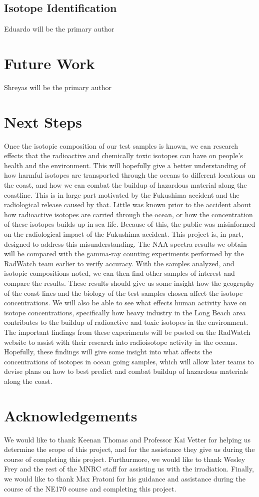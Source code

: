 \documentclass[]{article}
\begin{document}
\subsection{Isotope Identification}
Eduardo will be the primary author

\section{Future Work}
Shreyas will be the primary author


\section{Next Steps}
  
Once the isotopic composition of our test samples is known, we can research effects that the radioactive and chemically toxic isotopes can have on people’s health and the environment. This will hopefully give a better understanding of how harmful isotopes are transported through the oceans to different locations on the coast, and how we can combat the buildup of hazardous material along the coastline. This is in large part motivated by the Fukushima accident and the radiological release caused by that. Little was known prior to the accident about how radioactive isotopes are carried through the ocean, or how the concentration of these isotopes builds up in sea life. Because of this, the public was misinformed on the radiological impact of the Fukushima accident. This project is, in part, designed to address this misunderstanding. The NAA spectra results we obtain will be compared with the gamma-ray counting experiments performed by the RadWatch team earlier to verify accuracy. With the samples analyzed, and isotopic compositions noted, we can then find other samples of interest and compare the results. These results should give us some insight how the geography of the coast lines and the biology of the test samples chosen affect the isotope concentrations. We will also be able to see what effects human activity have on isotope concentrations, specifically how heavy industry in the Long Beach area contributes to the buildup of radioactive and toxic isotopes in the environment. The important findings from these experiments will be posted on the RadWatch website to assist with their research into radioisotope activity in the oceans. Hopefully, these findings will give some insight into what affects the concentrations of isotopes in ocean going samples, which will allow later teams to devise plans on how to best predict and combat buildup of hazardous materials along the coast. 

\section{Acknowledgements}

We would like to thank Keenan Thomas and Professor Kai Vetter for helping us determine the scope of this project, and for the assistance they give us during the course of completing this project. Furthurmore, we would like to thank Wesley Frey and the rest of the MNRC staff for assisting us with the irradiation. Finally, we would like to thank Max Fratoni for his guidance and assistance during the course of the NE170 course and completing this project.
\end{document}
